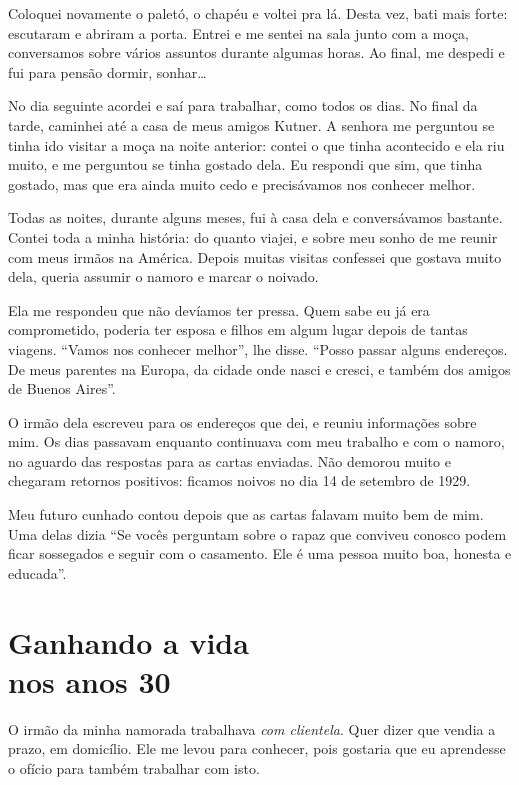 Coloquei novamente o paletó, o chapéu e voltei pra lá. Desta vez, bati mais
forte: escutaram e abriram a porta. Entrei e me sentei na sala junto com a moça, 
conversamos sobre vários assuntos durante algumas horas. Ao final, me
despedi e fui para pensão dormir, sonhar\ldots

No dia seguinte acordei e saí para trabalhar, como todos os dias. No final da tarde,
caminhei até a casa de meus amigos Kutner. A senhora me perguntou se
tinha ido visitar a moça na noite anterior: contei o que tinha
acontecido e ela riu muito, e me perguntou se tinha gostado dela. Eu respondi 
que sim, que tinha gostado, mas que era ainda muito
cedo e precisávamos nos conhecer melhor.

Todas as noites, durante alguns meses, fui à casa dela e conversávamos bastante. Contei toda a minha história: do quanto viajei, e
sobre meu sonho de me reunir com meus irmãos na América. Depois muitas visitas 
confessei que gostava muito dela, queria assumir o namoro e
marcar o noivado.

Ela me respondeu que não devíamos ter pressa. Quem sabe eu já era
comprometido, poderia ter esposa e filhos em algum lugar depois de tantas viagens. 
``Vamos nos conhecer melhor'', lhe disse. ``Posso passar alguns endereços. De meus parentes na Europa, da
cidade onde nasci e cresci, e também dos amigos de Buenos Aires''.

O irmão dela escreveu para os endereços que dei, e reuniu informações
sobre mim. Os dias passavam enquanto continuava com meu
trabalho e com o namoro, no aguardo das respostas para as cartas enviadas. Não
demorou muito e chegaram retornos positivos: ficamos noivos no dia 14 de
setembro de 1929.

Meu futuro cunhado contou depois que as cartas falavam muito bem de mim. Uma delas dizia ``Se vocês perguntam sobre o rapaz que conviveu
conosco podem ficar sossegados e seguir com o casamento. Ele é uma pessoa
muito boa, honesta e educada''.

\chapter*{Ganhando a vida\\nos anos 30}

O irmão da minha namorada trabalhava \textit{com clientela}. Quer dizer que vendia a
prazo, em domicílio. Ele me levou para conhecer, pois gostaria que eu aprendesse o ofício
para também trabalhar com isto.

